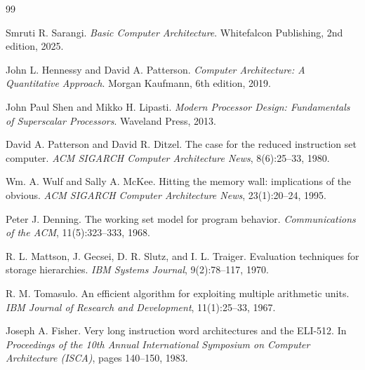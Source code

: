 \documentclass[11pt,a4paper]{report}
\begin{document}


\begin{thebibliography}{99}
\raggedright

Smruti R. Sarangi.
\emph{Basic Computer Architecture}.
Whitefalcon Publishing, 2nd edition, 2025.

John L. Hennessy and David A. Patterson.
\emph{Computer Architecture: A Quantitative Approach}.
Morgan Kaufmann, 6th edition, 2019.

John Paul Shen and Mikko H. Lipasti.
\emph{Modern Processor Design: Fundamentals of Superscalar Processors}.
Waveland Press, 2013.

David A. Patterson and David R. Ditzel.
The case for the reduced instruction set computer.
\emph{ACM SIGARCH Computer Architecture News}, 8(6):25--33, 1980.

Wm. A. Wulf and Sally A. McKee.
Hitting the memory wall: implications of the obvious.
\emph{ACM SIGARCH Computer Architecture News}, 23(1):20--24, 1995.

Peter J. Denning.
The working set model for program behavior.
\emph{Communications of the ACM}, 11(5):323--333, 1968.

R. L. Mattson, J. Gecsei, D. R. Slutz, and I. L. Traiger.
Evaluation techniques for storage hierarchies.
\emph{IBM Systems Journal}, 9(2):78--117, 1970.

R. M. Tomasulo.
An efficient algorithm for exploiting multiple arithmetic units.
\emph{IBM Journal of Research and Development}, 11(1):25--33, 1967.

Joseph A. Fisher.
Very long instruction word architectures and the ELI-512.
In \emph{Proceedings of the 10th Annual International Symposium on
Computer Architecture (ISCA)}, pages 140--150, 1983.


\end{thebibliography}
\end{document}
